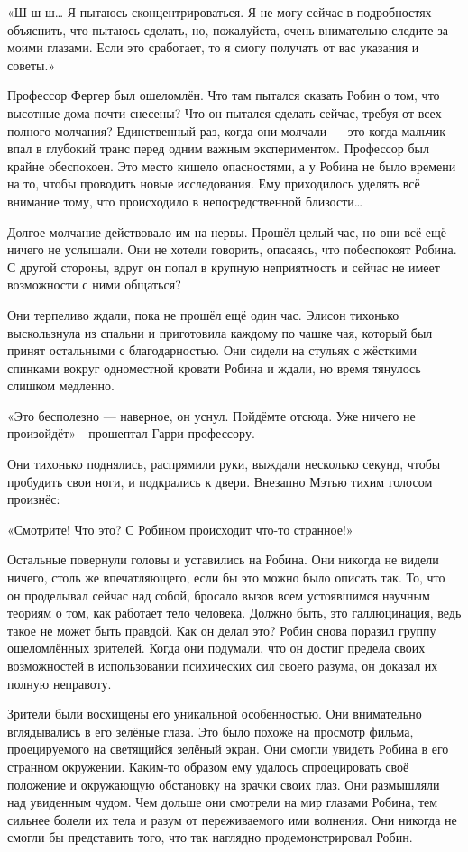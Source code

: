 \documentclass[a4paper,12pt]{book}
\begin{document}
«Ш-ш-ш… Я пытаюсь сконцентрироваться. Я не могу сейчас в подробностях объяснить, что пытаюсь сделать, но, пожалуйста, очень внимательно следите за моими глазами. Если это сработает, то я смогу получать от вас указания и советы.»
\par
Профессор Фергер был ошеломлён. Что там пытался сказать Робин о том, что высотные дома почти снесены? Что он пытался сделать сейчас, требуя от всех полного молчания?  Единственный раз, когда они молчали — это когда мальчик впал в глубокий транс перед одним важным экспериментом. Профессор был крайне обеспокоен. Это место кишело опасностями, а у Робина не было времени на то, чтобы проводить новые исследования. Ему приходилось уделять всё внимание тому, что происходило в непосредственной близости…\\
\par
Долгое молчание действовало им на нервы. Прошёл целый час, но они всё ещё ничего не услышали. Они не хотели говорить, опасаясь, что побеспокоят Робина. С другой стороны, вдруг он попал в крупную неприятность и сейчас не имеет возможности с ними общаться?
\par
Они терпеливо ждали, пока не прошёл ещё один час. Элисон тихонько выскользнула из спальни и приготовила каждому по чашке чая, который был принят остальными с благодарностью. Они сидели на стульях с жёсткими спинками вокруг одноместной кровати Робина и ждали, но время тянулось слишком медленно.
\par
«Это бесполезно — наверное, он уснул. Пойдёмте отсюда. Уже ничего не произойдёт» - прошептал Гарри профессору.
\par
Они тихонько поднялись, распрямили руки, выждали несколько секунд, чтобы пробудить свои ноги, и подкрались к двери. Внезапно Мэтью тихим голосом произнёс:
\par
«Смотрите! Что это? С Робином происходит что-то странное!»
\par
Остальные повернули головы и уставились на Робина. Они никогда не видели ничего, столь же впечатляющего, если бы это можно было описать так. То, что он проделывал сейчас над собой, бросало вызов всем устоявшимся научным теориям о том, как работает тело человека. Должно быть, это галлюцинация, ведь такое не может быть правдой. Как он делал это? Робин снова поразил группу ошеломлённых зрителей. Когда они подумали, что он достиг предела своих возможностей в использовании психических сил своего разума, он доказал их полную неправоту.\\
\par
Зрители были восхищены его уникальной особенностью. Они внимательно вглядывались в его зелёные глаза. Это было похоже на просмотр фильма, проецируемого на светящийся зелёный экран. Они смогли увидеть Робина в его странном окружении. Каким-то образом ему удалось спроецировать своё положение и окружающую обстановку на зрачки своих глаз. Они размышляли над увиденным чудом. Чем дольше они смотрели на мир глазами Робина, тем сильнее болели их тела и разум от переживаемого ими волнения. Они никогда не смогли бы представить того, что так наглядно продемонстрировал Робин.\\
\end{document}
